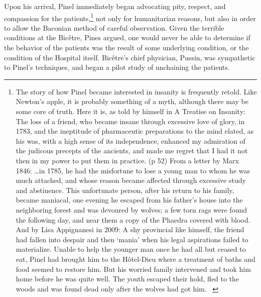 \begin{refsection}
Upon his arrival, Pinel immediately began advocating pity, respect, and compassion for the patients,\footnote{The story of how Pinel became interested in insanity is frequently retold. Like Newton's apple, it is probably something of a myth, although there may be some core of truth. Here it is, as told by himself in A Treatise on Insanity:
 The loss of a friend, who became insane through excessive love of glory, in 1783, and the ineptitude of pharmaceutic preparations to the mind elated, as his was, with a high sense of its independence, enhanced my admiration of the judicous precepts of the ancients, and made me regret that I had it not then in my power to put them in practice. (p 52)
From a letter by Marx 1846:
 {\ldots}in 1785, he had the misfortune to lose a young man to whom he was much attached, and whose reason became affected through excessive study and abstinence. This unfortunate person, after his return to his family, became maniacal, one evening he escaped from his father's house into the neighboring forest and was devoured by wolves; a few torn rags were found the following day, and near them a copy of the Phaedra covered with blood.
And by Lisa Appignanesi in 2009:
A shy provincial like himself, the friend had fallen into despair and then `mania' when his legal aspirations failed to materialize. Unable to help the younger man once he had all but ceased to eat, Pinel had brought him to the Hôtel-Dieu where a treatment of baths and food seemed to restore him. But his worried family intervened and took him home before he was quite well. The youth escaped their hold, fled to the woods and was found dead only after the wolves had got him. ~\citep[p. 58]{Marx:1847vc}} not only for humanitarian reasons, but also in order to allow the Baconian method of careful observation. Given the terrible conditions at the Bicêtre, Pines argued, one would never be able to determine if the behavior of the patients was the result of some underlying condition, or the condition of the Hospital itself. Bicêtre's chief physician, Pussin, was sympathetic to Pinel's techniques, and began a pilot study of unchaining the patients.


\end{refsection}
